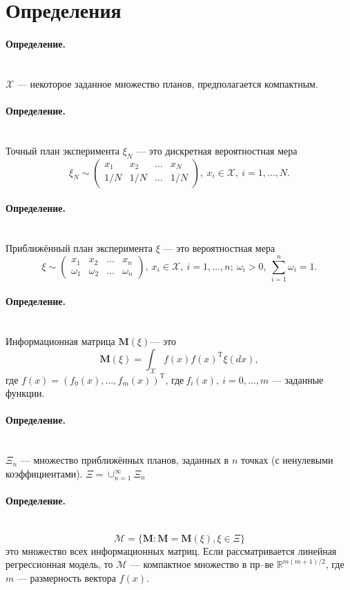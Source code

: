 \documentclass[12pt, a4paper]{article}
\newenvironment{definition}{\paragraph{Определение.}\hfill\\}{}
\newcommand{\R}{\mathbb{R}}
\begin{document}
	\section{Определения}
	\begin{definition}
		$\mathcal{X}$ --- некоторое заданное множество планов, предполагается компактным.
	\end{definition}
	\begin{definition}
		Точный план эксперимента $\xi_N$ --- это дискретная вероятностная мера
		\begin{equation*}
			\xi_N \sim
			\begin{pmatrix}
				x_1 & x_2 & \dots & x_N\\
				1/N & 1/N & \dots & 1/N
			\end{pmatrix}
			,~x_i\in\mathcal{X},~i=1,\dots,N.
		\end{equation*}
	\end{definition}
	\begin{definition}
		Приближённый план эксперимента $\xi$ --- это вероятностная мера
		\begin{equation*}
			\xi \sim
			\begin{pmatrix}
				x_1 & x_2 & \dots & x_n\\
				\omega_1 & \omega_2 & \dots & \omega_n
			\end{pmatrix},
			~x_i\in\mathcal{X},~i=1,\dots,n;~\omega_i>0,~\sum_{i=1}^n\omega_i = 1.
		\end{equation*}
	\end{definition}
	\begin{definition}
		Информационная матрица $\mathbf{M}(\xi)$--- это
		\begin{equation*}
			\mathbf{M}(\xi) = \int_\mathcal{X}f(x)f(x)^\mathrm{T}\xi(dx),
		\end{equation*}
		где $f(x)=(f_0(x),\dots, f_m(x))^\mathrm{T}$, где$~f_i(x),~i=0,\dots, m$ --- заданные функции.   
	\end{definition}
	\begin{definition}
		$\Xi_n$ --- множество приближённых планов, заданных в $n$ точках (с ненулевыми коэффициентами). $\Xi=\cup_{n=1}^\infty\Xi_n$ 
	\end{definition}
	\begin{definition}
		\begin{equation*}
			\mathcal{M}=\{\mathbf{M}:\mathbf{M}=\mathbf{M}(\xi),\xi\in\Xi\}
		\end{equation*}
		это множество всех информационных матриц.
	\end{definition}
	Если рассматривается линейная регрессионная модель, то $\mathcal{M}$ --- компактное множество в пр--ве $\R^{m(m+1)/2}$, где $m$ --- размерность вектора $f(x)$.
	
\end{document}
